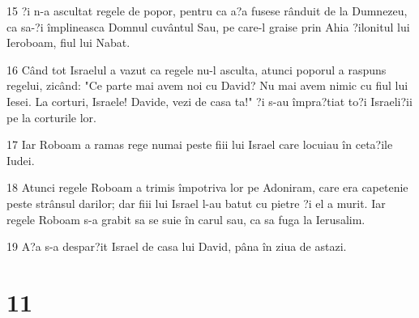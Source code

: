 \par 15 ?i n-a ascultat regele de popor, pentru ca a?a fusese rânduit de la Dumnezeu, ca sa-?i împlineasca Domnul cuvântul Sau, pe care-l graise prin Ahia ?ilonitul lui Ieroboam, fiul lui Nabat.
\par 16 Când tot Israelul a vazut ca regele nu-l asculta, atunci poporul a raspuns regelui, zicând: "Ce parte mai avem noi cu David? Nu mai avem nimic cu fiul lui Iesei. La corturi, Israele! Davide, vezi de casa ta!" ?i s-au împra?tiat to?i Israeli?ii pe la corturile lor.
\par 17 Iar Roboam a ramas rege numai peste fiii lui Israel care locuiau în ceta?ile Iudei.
\par 18 Atunci regele Roboam a trimis împotriva lor pe Adoniram, care era capetenie peste strânsul darilor; dar fiii lui Israel l-au batut cu pietre ?i el a murit. Iar regele Roboam s-a grabit sa se suie în carul sau, ca sa fuga la Ierusalim.
\par 19 A?a s-a despar?it Israel de casa lui David, pâna în ziua de astazi.

\chapter{11}

